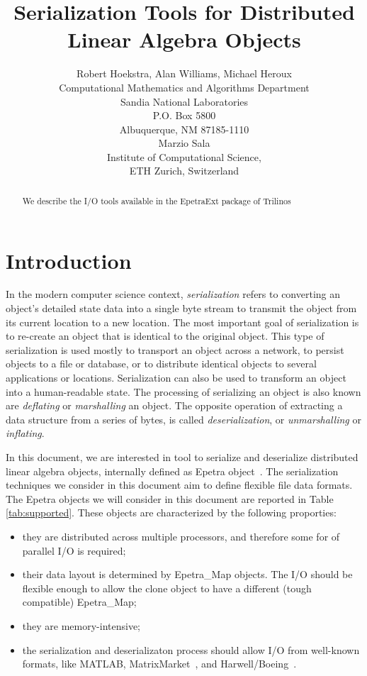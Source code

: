 \documentclass[11pt,relax]{SANDreport}
\author{Robert Hoekstra, Alan Williams, Michael Heroux\\
Computational Mathematics and Algorithms Department \\
Sandia National Laboratories \\
P.O. Box 5800 \\
Albuquerque, NM 87185-1110 \\[1cm]
Marzio Sala \\
Institute of Computational Science, \\
ETH Zurich, Switzerland}
\title{Serialization Tools for Distributed Linear Algebra Objects}
\begin{document}
\maketitle

\begin{abstract}
We describe  the I/O tools available in the EpetraExt package of Trilinos~\cite{trilinos-home-page}
\end{abstract}

\SANDmain

\tableofcontents

\newpage

\section{Introduction}
\label{sec:introduction}

In the modern computer science context, {\sl serialization} refers to
converting an object's detailed state data into a single byte stream to
transmit the object from its current location to a new location.  The most
important goal of serialization is to re-create an object that is identical to
the original object. This type of serialization is used mostly to transport an
object across a network, to persist objects to a file or database, or to
distribute identical objects to several applications or locations.
Serialization can also be used to transform an object into a human-readable
state. 
The processing of serializing an object is also known are {\sl deflating} or
{\sl marshalling} an object. The opposite operation of extracting a data
structure from a series of bytes, is called {\sl deserialization}, or {\sl
  unmarshalling} or {\sl inflating}. 

\smallskip

In this document, we are interested in tool to serialize and deserialize
distributed linear algebra objects, internally defined as Epetra
object~\cite{Epetra-Users-Guide}.  The serialization techniques we consider in
this document aim to define flexible file data formats. The Epetra objects we
will consider in this document are reported in Table \ref{tab:supported}.
These objects are characterized by the
following proporties:
\begin{itemize}
\item they are distributed across multiple processors, and therefore some for
of parallel I/O is required;
\item their data layout is determined by Epetra\_Map objects. The I/O should
be flexible enough to allow the clone object to have a different (tough
                                                                  compatible)
Epetra\_Map;
\item they are memory-intensive;
\item the serialization and deserializaton process should allow I/O from
well-known formats, like MATLAB, MatrixMarket~\cite{boisvert97matrix}, and
Harwell/Boeing~\cite{duff89sparse}.
\end{itemize}
\end{document}
